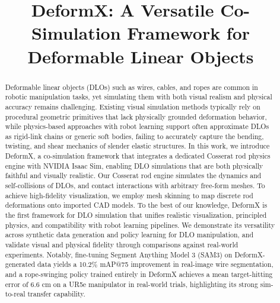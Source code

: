 \documentclass[letterpaper, 10 pt, conference]{ieeeconf}  %
\title{\Large \bf
DeformX: A Versatile Co-Simulation Framework for Deformable Linear Objects}
\begin{document}
\maketitle
\thispagestyle{empty}
\pagestyle{empty}






\begin{abstract}

Deformable linear objects (DLOs) such as wires, cables, and ropes are common in robotic manipulation tasks, yet simulating them with both visual realism and physical accuracy remains challenging. Existing visual simulation methods typically rely on procedural geometric primitives that lack physically grounded deformation behavior, while physics-based approaches with robot learning support often approximate DLOs as rigid-link chains or generic soft bodies, failing to accurately capture the bending, twisting, and shear mechanics of slender elastic structures. In this work, we introduce DeformX, a co-simulation framework that integrates a dedicated Cosserat rod physics engine with NVIDIA Isaac Sim, enabling DLO simulations that are both physically faithful and visually realistic. Our Cosserat rod engine simulates the dynamics and self-collisions of DLOs, and contact interactions with arbitrary free-form meshes. To achieve high-fidelity visualization, we employ mesh skinning to map discrete rod deformations onto imported CAD models. To the best of our knowledge, DeformX is the first framework for DLO simulation that unifies realistic visualization, principled physics, and compatibility with robot learning pipelines. We demonstrate its versatility across synthetic data generation and policy learning for DLO manipulation, and validate visual and physical fidelity through comparisons against real-world experiments. Notably, fine-tuning Segment Anything Model 3 (SAM3) on DeformX-generated data yields a 10.2\% mAP@75 improvement in real-image wire segmentation, and a rope-swinging policy trained entirely in DeformX achieves a mean target-hitting error of 6.6 cm on a UR5e manipulator in real-world trials, highlighting its strong sim-to-real transfer capability.

\end{abstract}



\end{document}
